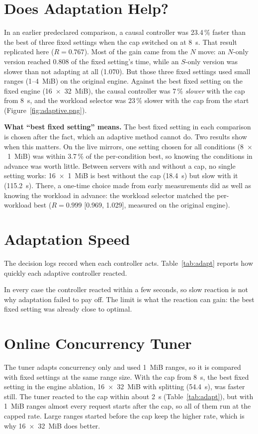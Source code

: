 \section{Does Adaptation Help?}\label{sec:adhelp}
In an earlier predeclared comparison, a causal controller was 23.4\,\% faster than the best of three fixed settings when the cap switched on at 8~s. That result replicated here ($R = 0.767$). Most of the gain came from the $N$ move: an $N$-only version reached 0.808 of the fixed setting's time, while an $S$-only version was slower than not adapting at all (1.070). But those three fixed settings used small ranges (1--4~MiB) on the original engine. Against the best fixed setting on the fixed engine (16~$\times$~32~MiB), the causal controller was 7\,\% \emph{slower} with the cap from 8~s, and the workload selector was 23\,\% slower with the cap from the start (Figure~\ref{fig:adaptive.png}).

\textbf{What ``best fixed setting'' means.} The best fixed setting in each comparison is chosen after the fact, which an adaptive method cannot do. Two results show when this matters. On the live mirrors, one setting chosen for all conditions (8~$\times$~1~MiB) was within 3.7\,\% of the per-condition best, so knowing the conditions in advance was worth little. Between servers with and without a cap, no single setting works: 16~$\times$~1~MiB is best without the cap (18.4~s) but slow with it (115.2~s). There, a one-time choice made from early measurements did as well as knowing the workload in advance: the workload selector matched the per-workload best ($R = 0.999$ [0.969, 1.029], measured on the original engine).

\section{Adaptation Speed}\label{sec:adapt}
The decision logs record when each controller acts. Table~\ref{tab:adapt} reports how quickly each adaptive controller reacted.

In every case the controller reacted within a few seconds, so slow reaction is not why adaptation failed to pay off. The limit is what the reaction can gain: the best fixed setting was already close to optimal.

\section{Online Concurrency Tuner}\label{sec:tuner}

The tuner adapts concurrency only and used 1~MiB ranges, so it is compared with fixed settings at the same range size. With the cap from 8~s, the best fixed setting in the engine ablation, 16~$\times$~32~MiB with splitting (54.4~s), was faster still. The tuner reacted to the cap within about 2~s (Table~\ref{tab:adapt}), but with 1~MiB ranges almost every request starts after the cap, so all of them run at the capped rate. Large ranges started before the cap keep the higher rate, which is why 16~$\times$~32~MiB does better.

